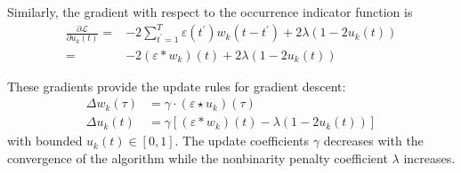 \documentclass[10pt,twocolumn]{article}
\begin{document}
Similarly, the gradient with respect to the occurrence indicator function is
\begin{equation}
\begin{split}
\frac{\partial \mathcal L}{\partial u_k(t)} 
= & 
-2 \sum\limits_{t^\prime=1}^T \varepsilon(t^\prime) w_k(t-t^\prime) 
+ 2\lambda(1-2u_k(t))
\\
= &
-2 (\varepsilon*w_k)(t) 
+ 2\lambda(1-2u_k(t))
\end{split}
\end{equation}

These gradients provide the update rules for gradient descent: 
\begin{align}
\Delta w_k(\tau) &= \gamma\cdot(\varepsilon \star u_k)(\tau)
\\
\Delta u_k(t) &= \gamma\left[(\varepsilon * w_k)(t)
- \lambda (1-2u_k(t))\right]
\end{align}
with bounded $u_k(t)\in [0,1]$.
The update coefficients $\gamma$ decreases with the convergence of the algorithm while the nonbinarity penalty coefficient $\lambda$  increases.



\end{document}

